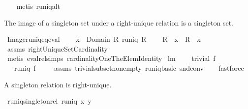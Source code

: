 \begin{isabellebody}
\ \ \isamarkupfalse%
\ {\isacharparenleft}metis\ runiq{\isacharunderscore}alt{\isacharparenright}%
\endisatagproof
{\isafoldproof}%
%
\isadelimproof
%
\endisadelimproof
%
\begin{isamarkuptext}%
The image of a singleton set under a right-unique relation is a singleton set.%
\end{isamarkuptext}%
\isamarkuptrue%
\isamarkupfalse%
\ Image{\isacharunderscore}runiq{\isacharunderscore}eq{\isacharunderscore}eval{\isacharcolon}\ \isanewline
\ \ \ {\isachardoublequoteopen}x\ {\isasymin}\ Domain\ R{\isachardoublequoteclose}\ {\isachardoublequoteopen}runiq\ R{\isachardoublequoteclose}\ \isanewline
\ \ \ {\isachardoublequoteopen}R\ {\isacharbackquote}{\isacharbackquote}\ {\isacharbraceleft}x{\isacharbraceright}\ {\isacharequal}\ {\isacharbraceleft}R\ {\isacharcomma}{\isacharcomma}\ x{\isacharbraceright}{\isachardoublequoteclose}\ \isanewline
%
\isadelimproof
\ \ %
\endisadelimproof
%
\isatagproof
{}\isamarkupfalse%
\ assms\ rightUniqueSetCardinality\isanewline
\ \ \isamarkupfalse%
\ {\isacharparenleft}metis\ eval{\isacharunderscore}rel{\isachardot}simps\ cardinalityOneTheElemIdentity{\isacharparenright}%
\endisatagproof
{\isafoldproof}%
%
\isadelimproof
\isanewline
%
\endisadelimproof
\isanewline
{}\isamarkupfalse%
\ lm{}{}{\isacharcolon}\ \isanewline
\ \ \ {\isachardoublequoteopen}trivial\ f{\isachardoublequoteclose}\ \isanewline
\ \ \ {\isachardoublequoteopen}runiq\ f{\isachardoublequoteclose}\ \isanewline
%
\isadelimproof
\ \ %
\endisadelimproof
%
\isatagproof
{}\isamarkupfalse%
\ assms\ trivial{\isacharunderscore}subset{\isacharunderscore}non{\isacharunderscore}empty\ runiq{\isacharunderscore}basic\ snd{\isacharunderscore}conv\isanewline
\ \ \isamarkupfalse%
\ fastforce%
\endisatagproof
{\isafoldproof}%
%
\isadelimproof
%
\endisadelimproof
%
\begin{isamarkuptext}%
A singleton relation is right-unique.%
\end{isamarkuptext}%
\isamarkuptrue%
\isamarkupfalse%
\ runiq{\isacharunderscore}singleton{\isacharunderscore}rel{\isacharcolon}\ {\isachardoublequoteopen}runiq\ {\isacharbraceleft}{\isacharparenleft}x{\isacharcomma}\ y{\isacharparenright}{\isacharbraceright}{\isachardoublequoteclose}\ \isanewline
%
\isadelimproof
\ \ %
\endisadelimproof
%
\isatagproof
{}\isamarkupfalse%

\end{isabellebody}
